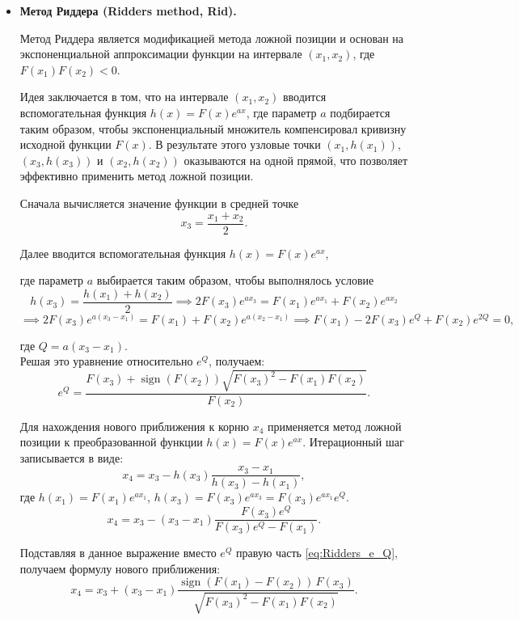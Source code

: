 \documentclass[12pt,a4paper]{article}
\theoremstyle{bigplain}
\theoremstyle{plain}
\begin{document}
\begin{itemize}
Итерационная формула имеет вид
\[
x_{k+1}=x_k-
\frac{F(x_k)}{F'(x_k)}
\left(
1-\frac{F(x_k)F''(x_k)}{2F'(x_k)^2}
\right)^{-1}.
\]

Метод Галлея обладает кубической скоростью
сходимости (p = 3).
Однако применение метода оправдано только
в тех случаях, когда вычисление второй
производной $F''(x)$ не приводит к
существенным дополнительным затратам
\cite{Press}.


\item \textbf{Метод Риддера (Ridders method, Rid).}

Метод Риддера является модификацией метода ложной позиции
и основан на экспоненциальной аппроксимации функции
на интервале $(x_1,x_2)$, где $F(x_1)F(x_2)<0$.

Идея заключается в том, что на интервале $(x_1, x_2)$ 
вводится вспомогательная функция $h(x) = F(x)e^{ax}$, 
где параметр $a$ подбирается таким образом, чтобы экспоненциальный 
множитель компенсировал кривизну исходной функции $F(x)$. 
В результате этого узловые точки $(x_1, h(x_1))$, $(x_3, h(x_3))$ 
и $(x_2, h(x_2))$ оказываются на одной прямой, 
что позволяет эффективно применить метод ложной позиции.

Сначала вычисляется значение функции
в средней точке
\[
x_3=\frac{x_1+x_2}{2}.
\]

Далее вводится вспомогательная функция $h(x)=F(x)e^{ax}$,

где параметр $a$ выбирается таким образом,
чтобы выполнялось условие
\[
h(x_3)=\frac{h(x_1)+h(x_2)}{2} \implies 2F(x_3)e^{ax_3}=F(x_1)e^{ax_1}+F(x_2)e^{ax_2}
\]
\[
\implies 2F(x_3)e^{a(x_3-x_1)}=F(x_1)+F(x_2)e^{a(x_2-x_1)} \implies F(x_1)-2F(x_3)e^{Q}+F(x_2)e^{2Q}=0,
\]

где $Q=a(x_3-x_1)$. \\
Решая это уравнение относительно $e^{Q}$, получаем:
\begin{equation}
e^{Q}
=
\frac{F(x_3)+\operatorname{sign}(F(x_2))
\sqrt{F(x_3)^2-F(x_1)F(x_2)}}
{F(x_2)}.
\tag{4.1}
\label{eq:Ridders_e_Q}
\end{equation}

Для нахождения нового приближения к корню $x_4$ применяется метод
ложной позиции к преобразованной функции $h(x) = F(x)e^{ax}$. 
Итерационный шаг записывается в виде:
\[
x_4 = x_3 - h(x_3) \frac{x_3 - x_1}{h(x_3) - h(x_1)},
\]
где $h(x_1) = F(x_1)e^{ax_1}$, $h(x_3) = F(x_3)e^{ax_3} = F(x_3)e^{ax_1}e^Q$.
\[
x_4 = x_3 - (x_3 - x_1) \frac{F(x_3)e^Q}{F(x_3)e^Q - F(x_1)}.
\]

Подставляя в данное выражение вместо $e^Q$ правую 
часть \eqref{eq:Ridders_e_Q}, получаем формулу нового приближения:
\[
x_4 = x_3 + (x_3 - x_1)
\frac{\operatorname{sign}(F(x_1) - F(x_2))\,F(x_3)}
{\sqrt{F(x_3)^2 - F(x_1)F(x_2)}}.
\]


\end{itemize}
\end{document}
